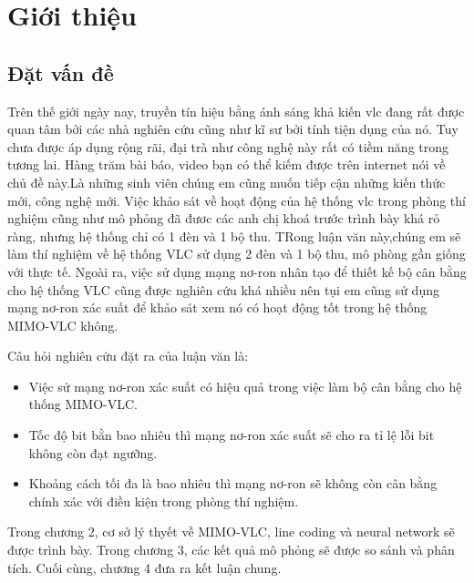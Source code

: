 \chapter{Giới thiệu} \label{sec:chuong-1} %

\section{Đặt vấn đề} \label{sec:chuong-1-datvande}
Trên thế giới ngày nay, truyền tín hiệu bằng ánh sáng khả kiến \ac{vlc} đang rất được quan tâm bởi các nhà nghiên cứu cũng như kĩ sư bởi tính tiện dụng của nó. Tuy chưa được áp dụng rộng rãi, đại trà như công nghệ này rất có tiềm năng trong tương lai. Hàng trăm bài báo, video bạn có thể kiếm được trên internet nói về chủ đề này.Là những sinh viên chúng em cũng muốn tiếp cận những kiến thức mới, công nghệ mới. Việc khảo sát về hoạt động của hệ thống \ac{vlc} trong phòng thí nghiệm cũng như mô phỏng đã đươc các anh chị khoá trước trình bày khá rỏ ràng, nhưng hệ thống chỉ có 1 đèn và 1 bộ thu. TRong luận văn này,chúng em sẽ làm thí nghiệm về hệ thống VLC sử dụng 2 đèn và 1 bộ thu, mô phòng gần giống với thực tế. Ngoài ra, việc sử dụng mạng nơ-ron nhân tạo để thiết kế bộ cân bằng cho hệ thống VLC cũng được nghiên cứu khá nhiều nên tụi em cũng sử dụng mạng nơ-ron xác suất để khảo sát xem nó có hoạt động tốt trong hệ thống MIMO-VLC không.  



Câu hỏi nghiên cứu đặt ra của luận văn là:
\begin{itemize}
	\item Việc sử mạng nơ-ron xác suất có hiệu quả trong việc làm bộ cân bằng cho hệ thống MIMO-VLC.
	\item Tốc độ bit bằn bao nhiêu thì mạng nơ-ron xác suất sẽ cho ra tỉ lệ lỗi bit không còn đạt ngưỡng.
	\item Khoảng cách tối đa là bao nhiêu thì mạng nơ-ron sẽ không còn cân bằng chính xác với điều kiện trong phòng thí nghiệm.  
	
\end{itemize}




	Trong chương 2, cơ sở lý thyết về MIMO-VLC, line coding và neural network sẽ được trình bày. 
	Trong chương 3, các kết quả mô phỏng sẽ được so sánh và phân tích. 
	Cuối cùng, chương 4 đưa ra kết luận chung.

